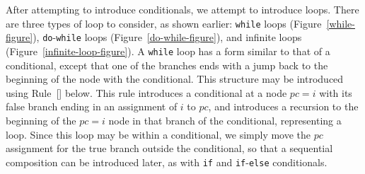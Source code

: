After attempting to introduce conditionals, we attempt to introduce
loops.
There are three types of loop to consider, as shown earlier:
\texttt{while} loops (Figure~\ref{while-figure}),
\texttt{do}-\texttt{while} loops (Figure~\ref{do-while-figure}), and
infinite loops (Figure~\ref{infinite-loop-figure}).
A \texttt{while} loop has a form similar to that of a conditional,
except that one of the branches ends with a jump back to the beginning
of the node with the conditional.
This structure may be introduced using
Rule~[] below.
This rule introduces a conditional at a node $pc=i$ with its false
branch ending in an assignment of $i$ to $pc$, and introduces a
recursion to the beginning of the $pc=i$ node in that branch of the
conditional, representing a loop.
Since this loop may be within a conditional, we simply move the $pc$
assignment for the true branch outside the conditional, so that a
sequential composition can be introduced later, as with \texttt{if}
and \texttt{if}-\texttt{else} conditionals.
